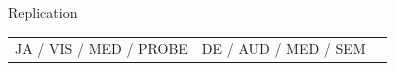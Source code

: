 \documentclass[final]{beamer}
\begin{document}
\begin{frame}{}
\begin{textblock}{67}
\begin{block}{Replication}
\begin{tabular}{c c c}
JA / VIS / MED / PROBE & DE / AUD / MED / SEM  & 
\end{tabular}
\end{block}
\end{textblock}
\end{frame}
\end{document}
